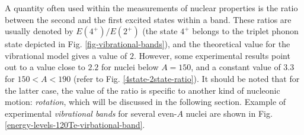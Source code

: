 A quantity often used within the measurements of nuclear properties is the ratio between the second and the first excited states within a band. These ratios are usually denoted by $E(4^+)/E(2^+)$ (the state $4^+$ belongs to the triplet phonon state depicted in Fig. \ref{fig-vibrational-bands}), and the theoretical value for the vibrational model gives a value of $2$. However, some experimental results point out to a value close to $2.2$ for nuclei below $A=150$, and a constant value of $3.3$ for $150<A<190$ (refer to Fig. \ref{4state-2state-ratio}). It should be noted that for the latter case, the value of the ratio is specific to another kind of nucleonic motion: \emph{rotation}, which will be discussed in the following section.
Example of experimental \emph{vibrational bands} for several even-$A$ nuclei are shown in Fig. \ref{energy-levels-120Te-virbational-band}.
